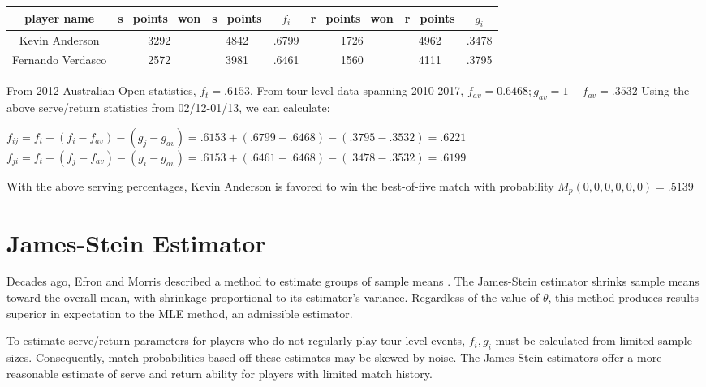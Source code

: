 \documentclass[chapterprefix=false]{report}
\begin{document}
\begin{center}
\begin{tabular}{ |c|c|c|c|c|c|c| } 
 \hline
 player name & s\_points\_won & s\_points
&$f_i$ & r\_points\_won & r\_points & $g_i$ \\ 
 \hline
 Kevin Anderson & 3292 & 4842 & .6799 & 1726 & 4962 & .3478\\ 
 \hline
 Fernando Verdasco & 2572 & 3981 & .6461 & 1560 & 4111 & .3795\\ 
 \hline
\end{tabular}
\end{center}

From 2012 Australian Open statistics, $f_t=.6153$. From tour-level data spanning 2010-2017, $f_{av} = 0.6468; g_{av} = 1-f_{av} =.3532$ Using the above serve/return statistics from 02/12-01/13, we can calculate:

\begin{center}
$f_{ij} = f_t + (f_i-f_{av})-(g_j-g_{av}) = .6153 + (.6799-.6468) - (.3795-.3532) = .6221$
$f_{ji} = f_t + (f_j-f_{av})-(g_i-g_{av}) = .6153 + (.6461-.6468) - (.3478-.3532) = .6199$
\end{center}

With the above serving percentages, Kevin Anderson is favored to win the best-of-five match with probability $M_p(0,0,0,0,0,0) = .5139$


\section{James-Stein Estimator}
Decades ago, Efron and Morris described a method to estimate groups of sample means \cite{EfronandMorris1977}. The James-Stein estimator shrinks sample means toward the overall mean, with shrinkage proportional to its estimator's variance. Regardless of the value of $\theta$, this method produces results superior in expectation to the MLE method, an admissible estimator.

To estimate serve/return parameters for players who do not regularly play tour-level events, $f_i,g_i$ must be calculated from limited sample sizes. Consequently, match probabilities based off these estimates may be skewed by noise. The James-Stein estimators offer a more reasonable estimate of serve and return ability for players with limited match history. 

\end{document}
